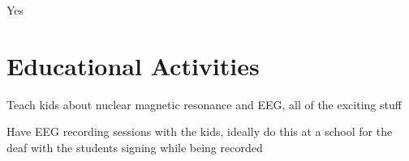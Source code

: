 \documentclass{proposal}
\begin{document}
Yes

\section{Educational Activities}

Teach kids about nuclear magnetic resonance and EEG, all of the exciting stuff

Have EEG recording sessions with the kids, ideally do this at a school for the deaf with the students signing while being recorded








\end{document}
